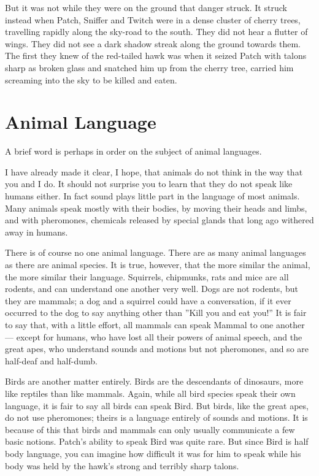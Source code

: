 \documentclass[12pt]{book}
\begin{document}
But it was not while they were on the ground that danger struck. It struck instead when Patch, Sniffer and Twitch were in a dense cluster of cherry trees, travelling rapidly along the sky-road to the south. They did not hear a flutter of wings. They did not see a dark shadow streak along the ground towards them. The first they knew of the red-tailed hawk was when it seized Patch with talons sharp as broken glass and snatched him up from the cherry tree, carried him screaming into the sky to be killed and eaten.


\section{Animal Language}

A brief word is perhaps in order on the subject of animal languages.

I have already made it clear, I hope, that animals do not think in the way that you and I do. It should not surprise you to learn that they do not speak like humans either. In fact sound plays little part in the language of most animals. Many animals speak mostly with their bodies, by moving their heads and limbs, and with pheromones, chemicals released by special glands that long ago withered away in humans.

There is of course no one animal language. There are as many animal languages as there are animal species. It is true, however, that the more similar the animal, the more similar their language. Squirrels, chipmunks, rats and mice are all rodents, and can understand one another very well. Dogs are not rodents, but they are mammals; a dog and a squirrel could have a conversation, if it ever occurred to the dog to say anything other than ''Kill you and eat you!'' It is fair to say that, with a little effort, all mammals can speak Mammal to one another ---
except for humans, who have lost all their powers of animal speech, and the great apes, who understand sounds and motions but not pheromones, and so are half-deaf and half-dumb.

Birds are another matter entirely. Birds are the descendants of dinosaurs, more like reptiles than like mammals. Again, while all bird species speak their own language, it is fair to say all birds can speak Bird. But birds, like the great apes, do not use pheromones; theirs is a language entirely of sounds and motions. It is because of this that birds and mammals can only usually communicate a few basic notions. Patch's ability to speak Bird was quite rare. But since Bird is half body language, you can imagine how difficult it was for him to speak while his body was held by the hawk's strong and terribly sharp talons.
\end{document}
